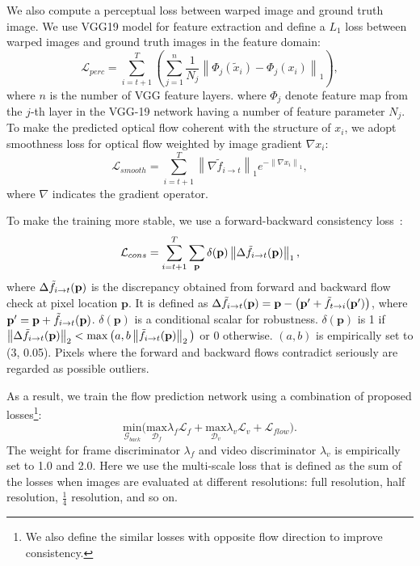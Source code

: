\documentclass[10pt,twocolumn,letterpaper]{article}
\begin{document}
We also compute a perceptual loss between warped image and ground truth image. We use VGG19 model \cite{vgg} for feature extraction and define a $L_1$ loss between warped images and ground truth images in the feature domain:
\begin{equation}
\mathcal{L}_{perc} = \sum_{i=t+1}^{T}\left ( \sum_{j=1}^{n}\frac{1}{N_j}\left \| \Phi_j(\tilde{x}_i) -\Phi_j(x_i) \right \|_1 \right ),
\end{equation}
where $n$ is the number of VGG feature layers. where $\Phi_j$ denote feature map from the $j$-th layer in the VGG-19 network having a number of feature parameter $N_j$.
To make the predicted optical flow coherent with the structure of $x_i$, we adopt smoothness loss for optical flow weighted by image gradient $\nabla x_i$:
\begin{equation}
    \mathcal{L}_{smooth} = \sum_{i=t+1}^{T}\left\| \nabla \tilde{f}_{i\rightarrow t} \right\|_1 e^{-\left\| \nabla x_i \right \|_1},
\end{equation}
where $\nabla$ indicates the gradient operator. 

To make the training more stable, we use a forward-backward consistency loss~\cite{yin2018geonet}:
\begin{equation}
    \mathcal{L}_{cons} = \sum_{i=t+1}^{T} \sum_\mathbf{p} \delta(\mathbf{p})  \left \| \Delta \Tilde{f}_{i \rightarrow t}(\mathbf{p}) \right \|_1,
\end{equation}
where $\Delta \Tilde{f}_{i \rightarrow t}(\mathbf{p})$ is the discrepancy obtained from forward and backward flow check at pixel location $\mathbf{p}$. It is defined as $\Delta \Tilde{f}_{i \rightarrow t}(\mathbf{p}) = \mathbf{p}- \big(\mathbf{p}' + \Tilde{f}_{t \rightarrow i}(\mathbf{p}')\big)$, where $\mathbf{p}'=\mathbf{p} + \Tilde{f}_{i \rightarrow t}(\mathbf{p})$. 
$\delta(\mathbf{p})$ is a conditional scalar for robustness. $\delta(\mathbf{p})$ is 1 if $\left \| \Delta \Tilde{f}_{i\rightarrow t}(\mathbf{p}) \right \|_2 < \max\big( a, b \left \| \Tilde{f}_{i\rightarrow t}(\mathbf{p}) \right \|_2 \big)$ or 0 otherwise. $(a, b)$ is empirically set to (3, 0.05). 
Pixels where the forward and backward flows contradict seriously are regarded as possible outliers.

As a result, we train the flow prediction network using a combination of proposed losses\footnote{We also define the similar losses with opposite flow direction to improve consistency.}:
\begin{equation}
    \underset{\mathcal{G}_{back}}{\mathrm{min}}\big(\underset{\mathcal{D}_f}{\mathrm{max}}\lambda_f\mathcal{L}_f + \underset{\mathcal{D}_v}{\mathrm{max}}\lambda_v\mathcal{L}_v + \mathcal{L}_{flow}\big).
\end{equation}
The weight for frame discriminator $\lambda_f$ and video discriminator $\lambda_v$ is empirically set to 1.0 and 2.0. Here we use the multi-scale loss that is defined as the sum of the losses when images are evaluated at different resolutions: full resolution, half resolution,  $\frac{1}{4}$ resolution, and so on.
\end{document}
